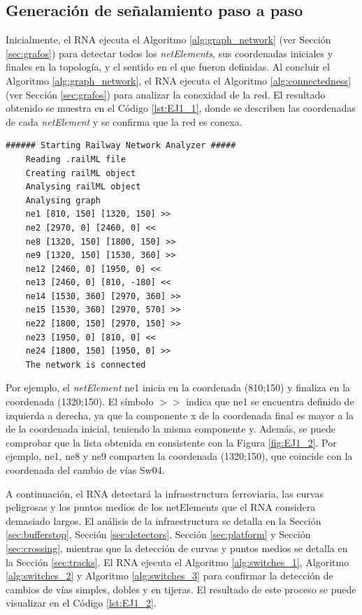 \subsection{Generación de señalamiento paso a paso}
	
	Inicialmente, el RNA ejecuta el Algoritmo \ref{alg:graph_network} (ver Sección \ref{sec:grafos}) para detectar todos los \textit{netElements}, sus coordenadas iniciales y finales en la topología, y el sentido en el que fueron definidas. Al concluir el Algoritmo \ref{alg:graph_network}, el RNA ejecuta el Algoritmo \ref{alg:connectedness} (ver Sección \ref{sec:grafos}) para analizar la conexidad de la red. El resultado obtenido se muestra en el Código \ref{lst:EJ1_1}, donde se describen las coordenadas de cada \textit{netElement} y se confirma que la red es conexa.
	
	\begin{lstlisting}[language = {}, caption = Detección de \textit{netElements} por parte del RNA , label = {lst:EJ1_1}]
	###### Starting Railway Network Analyzer #####
	Reading .railML file
	Creating railML object
	Analysing railML object
	Analysing graph
	ne1 [810, 150] [1320, 150] >>
	ne2 [2970, 0] [2460, 0] <<
	ne8 [1320, 150] [1800, 150] >>
	ne9 [1320, 150] [1530, 360] >>
	ne12 [2460, 0] [1950, 0] <<
	ne13 [2460, 0] [810, -180] <<
	ne14 [1530, 360] [2970, 360] >>
	ne15 [1530, 360] [2970, 570] >>
	ne22 [1800, 150] [2970, 150] >>
	ne23 [1950, 0] [810, 0] <<
	ne24 [1800, 150] [1950, 0] >>
	The network is connected
	\end{lstlisting}
	
	Por ejemplo, el \textit{netElement} ne1 inicia en la coordenada (810;150) y finaliza en la coordenada (1320;150). El símbolo $>>$ indica que ne1 se encuentra definido de izquierda a derecha, ya que la componente x de la coordenada final es mayor a la de la coordenada inicial, teniendo la misma componente y. Además, se puede comprobar que la lista obtenida en consistente con la Figura \ref{fig:EJ1_2}. Por ejemplo, ne1, ne8 y ne9 comparten la coordenada (1320;150), que coincide con la coordenada del cambio de vías Sw04.
	
	A continuación, el RNA detectará la infraestructura ferroviaria, las curvas peligrosas y los puntos medios de los netElements que el RNA considera demasiado largos. El análisis de la infraestructura se detalla en la Sección \ref{sec:bufferstop}, Sección \ref{sec:detectors}, Sección \ref{sec:platform} y Sección \ref{sec:crossing}, mientras que la detección de curvas y puntos medios se detalla en la Sección \ref{sec:tracks}. El RNA ejecuta el Algoritmo \ref{alg:switches_1}, Algoritmo \ref{alg:switches_2} y Algoritmo \ref{alg:switches_3} para confirmar la detección de cambios de vías simples, dobles y en tijeras. El resultado de este proceso se puede visualizar en el Código \ref{lst:EJ1_2}.
	
